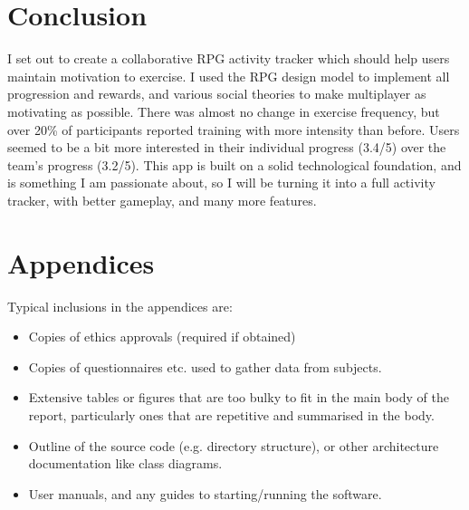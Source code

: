 \documentclass{l4proj}
\begin{document}
\chapter{Conclusion}    
I set out to create a collaborative RPG activity tracker which should help users maintain motivation to exercise. I used the RPG design model to implement all progression and rewards, and various social theories to make multiplayer as motivating as possible. There was almost no change in exercise frequency, but over 20\% of participants reported training with more intensity than before. Users seemed to be a bit more interested in their individual progress (3.4/5) over the team's progress (3.2/5). This app is built on a solid technological foundation, and is something I am passionate about, so I will be turning it into a full activity tracker, with better gameplay, and many more features.







\chapter{Appendices}


Typical inclusions in the appendices are:

\begin{itemize}
\item
  Copies of ethics approvals (required if obtained)
\item
  Copies of questionnaires etc. used to gather data from subjects.
\item
  Extensive tables or figures that are too bulky to fit in the main body of
  the report, particularly ones that are repetitive and summarised in the body.

\item Outline of the source code (e.g. directory structure), or other architecture documentation like class diagrams.

\item User manuals, and any guides to starting/running the software.

\end{itemize}
\end{document}
